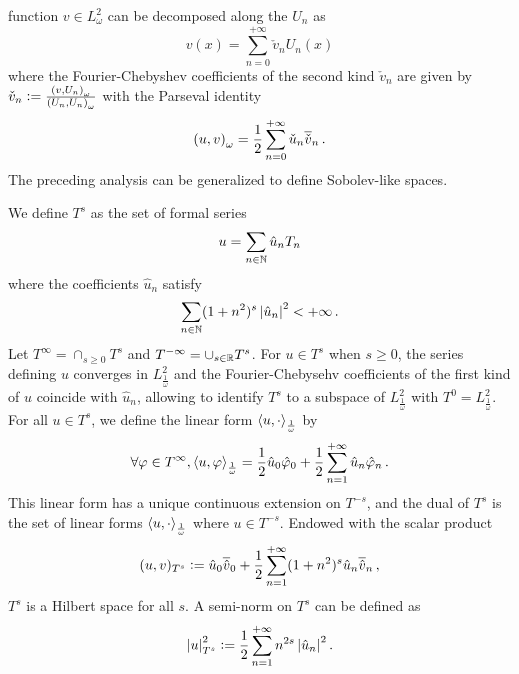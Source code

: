 \documentclass[a4paper]{article}
\begin{document}
function $v\in L^2_{\omega}$ can be decomposed along the $U_n$ as
\[ v(x) = \sum_{n=0}^{+\infty} \check{v}_n U_n(x)\]
where the Fourier-Chebyshev coefficients of the second kind $\check{v}_n$ are given by $ \check{v}_n \mathrel{\mathop:}= 
\frac{\left( v,U_n\right)_\omega}{\left( U_n,U_n\right)_\omega}$ with the Parseval identity
\[ \left( u,v\right)_\omega =  \frac{1}{2} \sum_{n=0}^{+\infty}\check{u}_n \overline{\check{v}}_n \,.\]
The preceding analysis can be generalized to define Sobolev-like spaces. 
\begin{Def}
	We define $T^s$ as the set of formal series
	\[u = \sum_{n \in \mathbb{N}} \hat{u}_n T_n\]
	where the coefficients $\hat{u}_n$ satisfy
	\[\sum_{n \in \mathbb{N}} (1 + n^2)^s \left\lvert \hat{u}_n \right\rvert^2 < + \infty\,.\]
	Let $T^{\infty} = \displaystyle\cap_{s \geq 0} T^s$ and $T^{-\infty} = \cup_{s \in \mathbb{R}} T^s$. For $u\in T^s$ when $s \geq 0$, the series defining $u$ converges in $L^2_\frac{1}{\omega}$ and the Fourier-Chebysehv coefficients of the first kind of $u$ coincide with $\hat{u}_n$, allowing to identify $T^s$ to a subspace of $L^2_\frac{1}{\omega}$ with $T^0 = L^2_\frac{1}{\omega}$. For all $u \in T^{s}$, we define the linear form $\left\langle u,\cdot\right\rangle_\frac{1}{\omega}$ by
	\begin{equation}
	\label{dualiteTs}
		\forall \varphi \in T^\infty, \left\langle u,\varphi\right\rangle_\frac{1}{\omega} = \frac{1}{2} \hat{u}_0 \hat \varphi_{0} + \frac{1}{2}\sum_{n = 1}^{+ \infty} \hat{u}_n \hat{\varphi}_n\,.
	\end{equation}
	This linear form has a unique continuous extension on $T^{-s}$, and the dual of $T^s$ is the set of linear forms $\left\langle u,\cdot\right\rangle_\frac{1}{\omega}$ where $u \in T^{-s}$.  
	Endowed with the scalar product
	\[(u,v)_{T^s} \mathrel{\mathop:}= \hat{u}_0 \overline{\hat{v}}_0 + \frac{1}{2}\sum_{n=1}^{+\infty}(1 + n^{2})^s\hat{u}_n \overline{\hat{v}}_n\,,\]
	$T^s$ is a Hilbert space for all $s$. A semi-norm on $T^s$ can be defined as
	\[\left\lvert u \right\rvert_{T^s}^2 \mathrel{\mathop:}= \frac{1}{2}\sum_{n = 1}^{+ \infty}n^{2s} \left\lvert \hat{u}_n \right\rvert^2.\] 
\end{Def}
\end{document}
